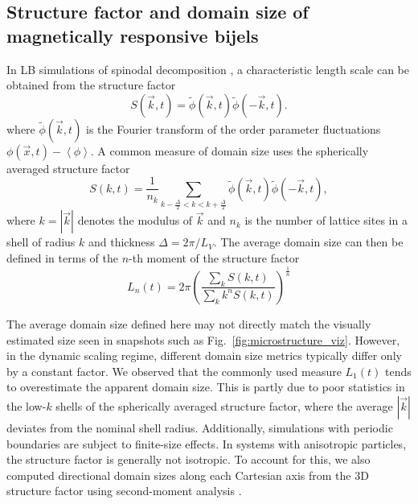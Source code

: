 \subsection{Structure factor and domain size of magnetically responsive bijels}
    
    In LB simulations of spinodal decomposition
    \cite{kendon_3d_1999,kendon_inertial_2001}, a characteristic length
    scale can be obtained from the structure factor
    \begin{equation}
    S(\vec{k},t) = \tilde{\phi}(\vec{k},t)\tilde{\phi}(-\vec{k},t) .
    \end{equation}
    where \(\tilde{\phi}(\vec{k},t)\) is the Fourier
    transform of the order parameter fluctuations
    \(\phi(\vec{x},t)-\left\langle\phi\right\rangle\). A common measure of
    domain size uses the spherically averaged structure factor
    \begin{equation}
    S(k,t) = \frac{1}{n_k} \sum_{k-\frac{\Delta}{2}<k<k+\frac{\Delta}{2}} \tilde{\phi}(\vec{k},t)\tilde{\phi}(-\vec{k},t) ,
    \end{equation}
    where \(k=|\vec{k}|\) denotes the modulus of \(\vec{k}\)
    and \(n_k\) is the number of lattice sites in a shell of radius \(k\)
    and thickness \(\Delta=2\pi/L_V\). The average domain size can then be
    defined in terms of the \(n\)-th moment of the structure factor
    \cite{laradji_molecular_1996}
    \begin{equation}
        L_n(t) = 2\pi \left( \frac{\sum_k S(k,t)}{\sum_k k^n S(k,t)} \right)^{\frac{1}{n}}
    \end{equation}
    
The average domain size defined here may not directly match the visually estimated size seen in snapshots such as Fig.~\ref{fig:microstructure_viz}. 
However, in the dynamic scaling regime, different domain size metrics typically differ only by a constant factor. We observed that the commonly used 
measure \(L_1(t)\) tends to overestimate the apparent domain size. This is partly due to poor statistics in the low-\(k\) shells of the spherically 
averaged structure factor, where the average \(|\vec{k}|\) deviates from the nominal shell radius. Additionally, simulations with periodic boundaries 
are subject to finite-size effects. In systems with anisotropic particles, the structure factor is generally not isotropic. To account for this, we 
also computed directional domain sizes along each Cartesian axis from the 3D structure factor using second-moment analysis \cite{jansen_bijels_2011, 
gunther_timescales_2014}.

